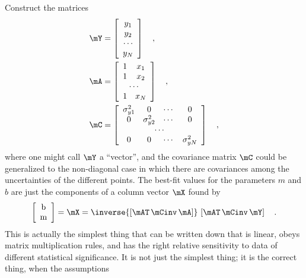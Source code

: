 \documentclass[12pt,twoside,pdftex]{article}
\begin{document}
Construct the matrices
\begin{align}\label{eq:mY}
\mY &= \left[\begin{array}{c}
y_1 \\
y_2 \\
\cdots \\
y_N
\end{array}\right] \quad ,\\
\mA &= \left[\begin{array}{cc}
1 & x_1 \\
1 & x_2 \\
\multicolumn{2}{c}{\cdots} \\
1 & x_N
\end{array}\right] \quad ,\\
\mC & = \left[\begin{array}{cccc}
\sigma_{y1}^{2} & 0 & \cdots & 0 \\
0 & \sigma_{y2}^{2} & \cdots & 0 \\
\multicolumn{4}{c}{\cdots} \\
0 & 0 & \cdots & \sigma_{yN}^{2}
\end{array}\right] \quad ,\label{eq:covar}
\end{align}
where one might call $\mY$ a ``vector'', and the covariance matrix
$\mC$ could be generalized to the non-diagonal case in which there are
covariances among the uncertainties of the different points.  The
best-fit values for the parameters $m$ and $b$ are just the components
of a column vector $\mX$ found by
\begin{equation}\label{eq:lsf}
\left[\begin{array}{c} $b$ \\ $m$ \end{array}\right]
 = \mX = \inverse{\left[\mAT\,\mCinv\,\mA\right]}
  \,\left[\mAT\,\mCinv\,\mY\right] \quad .
\end{equation}
This is actually the simplest thing that can be written down that is
linear, obeys matrix multiplication rules, and has the right relative
sensitivity to data of different statistical significance.  It is not
just the simplest thing; it is the correct thing, when the assumptions
\end{document}
